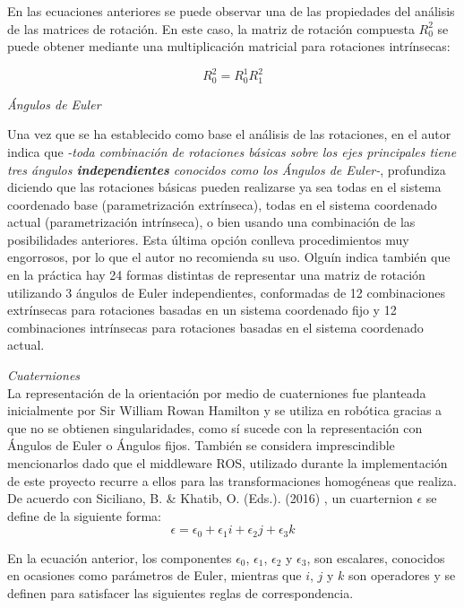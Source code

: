 En las ecuaciones anteriores se puede observar una de las propiedades del análisis de las matrices de rotación. En este caso, la matriz de rotación compuesta $R_{0}^{2}$ se puede obtener mediante una multiplicación matricial para rotaciones intrínsecas:

\begin{equation*} R_{0}^{2}=R_{0}^{1}R_{1}^{2}
\end{equation*}

\emph{Ángulos de Euler}

Una vez que se ha establecido como base el análisis de las rotaciones, en \cite{olguin_diaz_3d_2019} el autor indica que \textit{-toda combinación de rotaciones básicas sobre los ejes principales tiene tres ángulos \textbf{independientes} conocidos como los Ángulos de Euler-}, profundiza diciendo que las rotaciones básicas pueden realizarse ya sea todas en el sistema coordenado base (parametrización extrínseca), todas en el sistema coordenado actual (parametrización intrínseca), o bien usando una combinación de las posibilidades anteriores. Esta última opción conlleva procedimientos muy engorrosos, por lo que el autor no recomienda su uso. Olguín indica también que en la práctica hay 24 formas distintas de representar una matriz de rotación utilizando 3 ángulos de Euler independientes, conformadas de 12 combinaciones extrínsecas para rotaciones basadas en un sistema coordenado fijo y 12 combinaciones intrínsecas para rotaciones basadas en el sistema coordenado actual.

\emph{Cuaterniones}\\
La representación de la orientación por medio de cuaterniones fue planteada inicialmente por Sir William Rowan Hamilton \cite{hamilton_ii_1844} y se utiliza en robótica gracias a que no se obtienen singularidades, como sí sucede con la representación con Ángulos de Euler o Ángulos fijos. También se considera imprescindible mencionarlos dado que el middleware ROS, utilizado durante la implementación de este proyecto recurre a ellos para las transformaciones homogéneas que realiza.
De acuerdo con Siciliano, B. \& Khatib, O. (Eds.). (2016) \cite{siciliano_springer_2016}, un cuarternion \textbf{$\epsilon$} se define de la siguiente forma:
\begin{equation*}
    \epsilon = \epsilon_{0}+\epsilon_{1}i+
    \epsilon_{2}j+
    \epsilon_{3}k
\end{equation*}

En la ecuación anterior, los componentes $\epsilon_{0}$, $\epsilon_{1}$, $\epsilon_{2}$ y $\epsilon_{3}$, son escalares, conocidos en ocasiones como parámetros de Euler, mientras que $i$, $j$ y $k$ son operadores y se definen para satisfacer las siguientes reglas de correspondencia.

